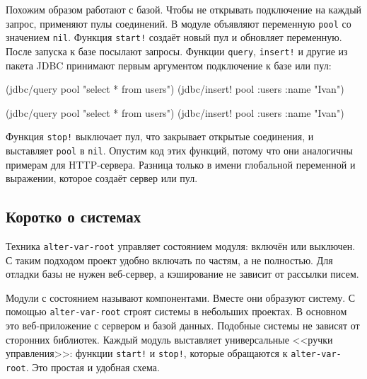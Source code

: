 
Похожим образом работают с базой. Чтобы не открывать подключение на каждый
запрос, применяют пулы соединений. В модуле объявляют переменную \verb|pool| со
значением \verb|nil|. Функция \verb|start!| создаёт новый пул и обновляет
переменную. После запуска к базе посылают запросы. Функции \verb|query|,
\verb|insert!| и другие из пакета JDBC принимают первым аргументом подключение к
базе или пул:

\ifnarrow

\begin{english}
  \begin{clojure}
(jdbc/query pool "select * from users")
(jdbc/insert! pool
  :users {:name "Ivan"})
  \end{clojure}
\end{english}

\else

\begin{english}
  \begin{clojure}
(jdbc/query pool "select * from users")
(jdbc/insert! pool :users {:name "Ivan"})
  \end{clojure}
\end{english}

\fi

Функция \verb|stop!| выключает пул, что закрывает открытые соединения, и
выставляет \verb|pool| в \verb|nil|. Опустим код этих функций, потому что они
аналогичны примерам для HTTP-сервера. Разница только в имени глобальной
переменной и выражении, которое создаёт сервер или пул.

\subsection{Коротко о системах}


\label{systems-intro}

Техника \verb|alter-var-root| управляет состоянием модуля: включён или
выключен. С таким подходом проект удобно включать по частям, а не полностью. Для
отладки базы не нужен веб-сервер, а кэширование не зависит от рассылки писем.

Модули с состоянием называют компонентами. Вместе они образуют систему. С
помощью \verb|alter-var-root| строят системы в небольших проектах. В основном
это веб-приложение с сервером и базой данных. Подобные системы не зависят от
сторонних библиотек. Каждый модуль выставляет универсальные <<ручки
управления>>: функции \verb|start!| и \verb|stop!|, которые обращаются к
\verb|alter-var-root|. Это простая и удобная схема.

